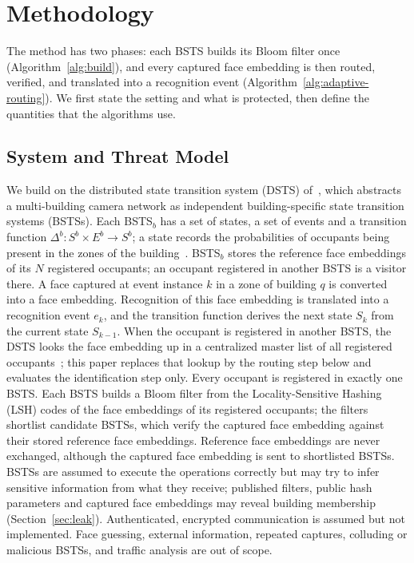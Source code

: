 \documentclass[pdflatex,sn-mathphys-num]{sn-jnl}%
\theoremstyle{thmstyleone}%
\theoremstyle{thmstyletwo}%
\theoremstyle{thmstylethree}%
\begin{document}
\section{Methodology}
\label{sec:method}

The method has two phases: each BSTS builds its Bloom filter once (Algorithm~\ref{alg:build}), and every captured face embedding is then routed, verified, and translated into a recognition event (Algorithm~\ref{alg:adaptive-routing}). We first state the setting and what is protected, then define the quantities that the algorithms use.

\subsection{System and Threat Model}
\label{sec:model}

We build on the distributed state transition system (DSTS) of~\cite{mohan2020}, which abstracts a multi-building camera network as independent building-specific state transition systems (BSTSs). Each BSTS$_b$ has a set of states, a set of events and a transition function $\Delta^b:S^b\times E^b\to S^b$; a state records the probabilities of occupants being present in the zones of the building~\cite{mohan2020,MJG2011}. BSTS$_b$ stores the reference face embeddings of its $N$ registered occupants; an occupant registered in another BSTS is a visitor there. A face captured at event instance $k$ in a zone of building $q$ is converted into a face embedding. Recognition of this face embedding is translated into a recognition event $e_k$, and the transition function derives the next state $S_k$ from the current state $S_{k-1}$. When the occupant is registered in another BSTS, the DSTS looks the face embedding up in a centralized master list of all registered occupants~\cite{mohan2020}; this paper replaces that lookup by the routing step below and evaluates the identification step only. Every occupant is registered in exactly one BSTS. Each BSTS builds a Bloom filter from the Locality-Sensitive Hashing (LSH) codes of the face embeddings of its registered occupants; the filters shortlist candidate BSTSs, which verify the captured face embedding against their stored reference face embeddings. Reference face embeddings are never exchanged, although the captured face embedding is sent to shortlisted BSTSs. BSTSs are assumed to execute the operations correctly but may try to infer sensitive information from what they receive; published filters, public hash parameters and captured face embeddings may reveal building membership (Section~\ref{sec:leak}). Authenticated, encrypted communication is assumed but not implemented. Face guessing, external information, repeated captures, colluding or malicious BSTSs, and traffic analysis are out of scope.
\end{document}
